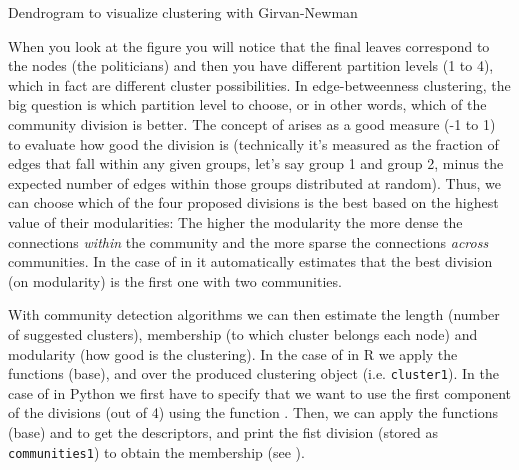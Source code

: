 \begin{ccsexample}
  \caption{Dendrogram to visualize clustering with Girvan-Newman}
  \label{ex:girvan}
\end{ccsexample}



When you look at the figure you will notice that the final leaves correspond to the nodes (the politicians) and then you have different partition levels (1 to 4), which in fact are different cluster possibilities. In edge-betweenness clustering, the big question is which partition level to choose, or in other words, which of the community division is better. The concept of  arises as a good measure (-1 to 1) to evaluate how good the division is (technically it's measured as the fraction of edges that fall within any given groups, let's say group 1 and group 2, minus the expected number of edges within those groups distributed at random). Thus, we can choose which of the four proposed divisions is the best based on the highest value of their modularities: The higher the modularity the more dense the connections \textit{within} the community and the more sparse the connections \textit{across} communities. In the case of  in  it automatically estimates that the best division (on modularity) is the first one with two communities.

With community detection algorithms we can then estimate the length (number of suggested clusters), membership (to which cluster belongs each node) and modularity (how good is the clustering). In the case of  in R we apply the functions  (base),  and  over the produced clustering object (i.e. \texttt{cluster1}). In the case of  in Python we first have to specify that we want to use the first component of the divisions (out of 4) using the function . Then, we can apply the functions  (base) and  to get the descriptors, and print the fist division (stored as \texttt{communities1}) to obtain the membership (see ).


